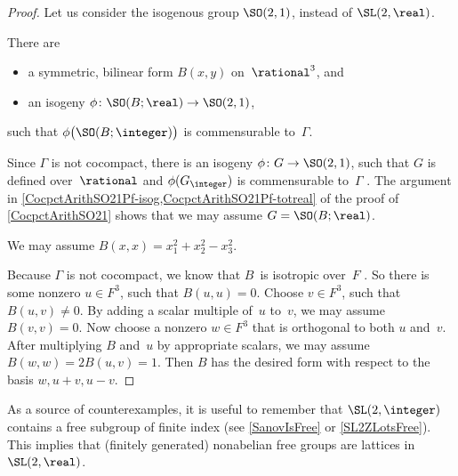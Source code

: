 \begin{proof}
 Let us consider the isogenous group $\SO(2,1)$, instead of
$\SL(2,\real)$.

\setcounter{step}{0}

\begin{step} \label{NoncocptSL2R=SL2Z-isog}
 There are 
 \begin{itemize}
 \item a symmetric, bilinear form $B(x,y)$ on~$\rational^3$,
and
 \item an isogeny $\phi \colon \SO(B;\real) \to
\SO(2,1)$,
 \end{itemize}
 such that $\phi \bigl( \SO(B;\integer) \bigr)$ is
commensurable to~$\Gamma$. 
 \end{step}
 Since $\Gamma$ is not cocompact, there is an isogeny $\phi \colon G \to \SO(2,1)$, such that $G$ is defined over~$\rational$ and $\phi(G_\integer)$ is commensurable to~$\Gamma$ . The argument in \cref{CocpctArithSO21Pf-isog,CocpctArithSO21Pf-totreal} of the proof of
\cref{CocpctArithSO21} shows that we may assume $G = \SO(B;\real)$.

\begin{step} \label{CocpctArithSO21Pf-21}
 We may assume $B(x,x) = x_1^2 + x_2^2 - x_3^2$.
 \end{step}
 Because $\Gamma$ is not cocompact, we know that $B$~is
isotropic over~$F$ . So there is some nonzero $u \in F^3$, such that $B(u,u) = 0$. Choose $v \in F^3$, such that $B(u,v) \neq 0$. By adding a scalar multiple of~$u$ to~$v$, we may assume $B(v,v) = 0$. Now choose a nonzero $w \in F^3$ that is orthogonal to both $u$ and~$v$. After multiplying $B$ and~$u$ by appropriate scalars, we may assume $B(w,w) = 2B(u,v) = 1$. Then $B$ has the desired form with respect to the basis $w, u+v, u-v$.
 \end{proof}

\begin{rem} \label{FreeLattINSL2R}
As a source of counterexamples, it is useful to remember that $\SL(2,\integer)$ contains a free subgroup of finite index (see 
\cref{SanovIsFree} or \ref{SL2ZLotsFree}). %
This implies that (finitely generated) nonabelian free groups are lattices in $\SL(2,\real)$.
\end{rem}


